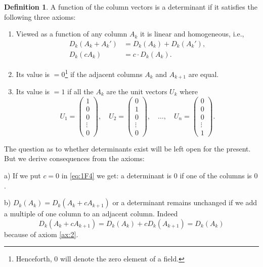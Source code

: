 \documentclass[10pt,leqno,a5paper]{book}
\theoremstyle{definition}
\newtheorem*{defi*}{Definition}
\begin{document}
\begin{defi*}
A function of the column vectors is a determinant if it satisfies the following three axioms:
\begin{enumerate}
\item
\label{ax:1}
Viewed as a function of any column $A_k$ it is linear and homogeneous, i.e.,
\begin{align}
\label{eq:1F3}
D_k(A_k + A_k') &= D_k(A_k) + D_k(A_k'),
\\
\label{eq:1F4}
D_k(c A_k) &= c \cdot D_k(A_k).
\end{align}

\item
\label{ax:2}
Its value is $=0$\footnote{Henceforth, $0$ will denote the zero element of a field.} if the adjacent columns $A_k$ and $A_{k+1}$ are equal.

\item
\label{ax:3}
Its value is $=1$ if all the $A_k$ are the unit vectors $U_k$ where
\begin{equation}
\label{eq:1F5}
U_1 = \begin{pmatrix}
1 \\
0 \\
0 \\
\vdots \\
0
\end{pmatrix},
\quad
U_2 = \begin{pmatrix}
0 \\
1 \\
0 \\
\vdots \\
0
\end{pmatrix},
\quad
\ldots,
\quad
U_n = \begin{pmatrix}
0 \\
0 \\
0 \\
\vdots \\
1
\end{pmatrix}.
\end{equation}
\end{enumerate}
\end{defi*}


The question as to whether determinants exist will be left open for the present.
But we derive consequences from the axioms:


a) If we put $c = 0$ in \eqref{eq:1F4} we get: a determinant is $0$ if one of the columns is $0$.

b) $D_k(A_k) = D_k(A_k + c A_{k+1})$ or a determinant remains unchanged if we add a multiple of one column to an adjacent column. Indeed
\[
D_k(A_k + c A_{k+1})
= D_k(A_k) + c D_k(A_{k+1})
= D_k(A_k)
\]
because of axiom \ref{ax:2}.
\end{document}
